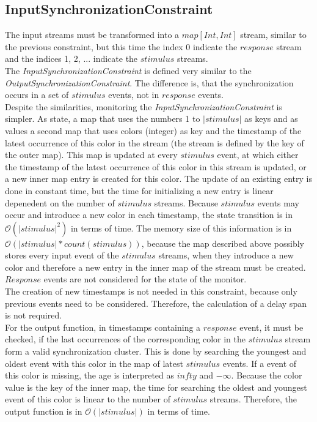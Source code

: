 \subsection{InputSynchronizationConstraint}
	The input streams must be transformed into a $map[Int, Int]$ stream, similar to the previous constraint, but this time the index 0 indicate the $response$ stream and the indices 1, 2, ... indicate the $stimulus$ streams.\\
	The \emph{InputSynchronizationConstraint} is defined very similar to the \emph{OutputSynchronizationConstraint}. The difference is, that the synchronization occurs in a set of $stimulus$ events, not in $response$ events.\\
	Despite the similarities, monitoring the \emph{InputSynchronizationConstraint} is simpler. As state, a map that uses the numbers 1 to $|stimulus|$ as keys and as values a second map that uses colors (integer) as key and the timestamp of the latest occurrence of this color in the stream (the stream is defined by the key of the outer map). This map is updated at every $stimulus$ event, at which either the timestamp of the latest occurrence of this color in this stream is updated, or a new inner map entry is created for this color.  The update of an existing entry is done in constant time, but the time for initializing a new entry is linear depenedent on the number of $stimulus$ streams. Because $stimulus$ events may occur and introduce a new color in each timestamp, the state transition is in $\mathcal{O}(|stimulus|^2)$ in terms of time. The memory size of this information is in $\mathcal{O}(|stimulus|*count(stimulus))$, because the map described above possibly stores every input event of the $stimulus$ streams, when they introduce a new color and therefore a new entry in the inner map of the stream must be created. $Response$ events are not considered for the state of the monitor.\\
	The creation of new timestamps is not needed in this constraint, because only previous events need to be considered. Therefore, the calculation of a delay span is not required.\\
	For the output function, in timestamps containing a $response$ event, it must be checked, if the last occurrences of the corresponding color in the $stimulus$ stream form a valid synchronization cluster. This is done by searching the youngest and oldest event with this color in the map of latest $stimulus$ events. If a event of this color is missing, the age is interpreted as $infty$ and $-\infty$. Because the color value is the key of the inner map, the time for searching the oldest and youngest event of this color is linear to the number of $stimulus$ streams. Therefore, the output function is in $\mathcal{O}(|stimulus|)$ in terms of time.
	
